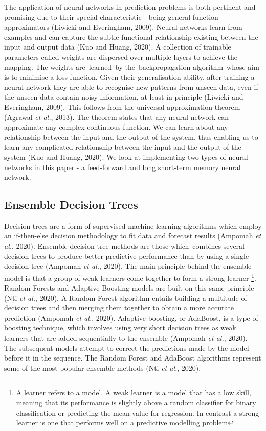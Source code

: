 The application of neural networks in prediction problems is both pertinent and promising due to their special characteristic - being general function approximators (Liwicki and Everingham, 2009). Neural networks learn from examples and can capture the subtle functional relationship existing between the input and output data (Kuo and Huang, 2020).  A collection of trainable parameters called weights are dispersed over multiple layers to achieve the mapping. The weights are learned by the backpropagation algorithm whose aim is to minimise a loss function. Given their generalisation ability, after training a neural network they are able to recognise new patterns from unseen data, even if the unseen data contain noisy information, at least in principle (Liwicki and Everingham, 2009). This follows from the universal approximation theorem (Agrawal \textit{et al.}, 2013). The theorem states that any neural network can approximate any complex continuous function. We can learn about any relationship between the input and the output of the system, thus enabling us to learn any complicated relationship between the input and the output of the system (Kuo and Huang, 2020). We look at implementing two types of neural networks in this paper - a feed-forward and long short-term memory neural network.



\subsection{Ensemble Decision Trees}

Decision trees are a form of supervised machine learning algorithms which employ an if-then-else decision methodology to fit data and forecast results (Ampomah \textit{et al.}, 2020). Ensemble decision tree methods are those which combines several decision trees to produce better predictive performance than by using a single decision tree (Ampomah \textit{et al.}, 2020). The main principle behind the ensemble model is that a group of weak learners come together to form a strong learner \footnote{A learner refers to a model. A weak learner is a model that has a low skill, meaning that its performance is slightly above a random classifier for binary classification or predicting the mean value for regression. In contrast a strong learner is one that performs well on a predictive modelling problem}. Random Forests and Adaptive Boosting models are built on this same principle (Nti \textit{et al.}, 2020).  A Random Forest algorithm entails building a multitude of decision trees and then merging them together to obtain a more accurate prediction (Ampomah \textit{et al.}, 2020). Adaptive boosting, or AdaBoost, is a type of boosting technique, which involves using very short decision trees as weak learners that are added sequentially to the ensemble (Ampomah \textit{et al.}, 2020). The subsequent models attempt to correct the predictions made by the model before it in the sequence. The Random Forest and AdaBoost algorithms represent some of the most popular ensemble methods (Nti \textit{et al.}, 2020). 


